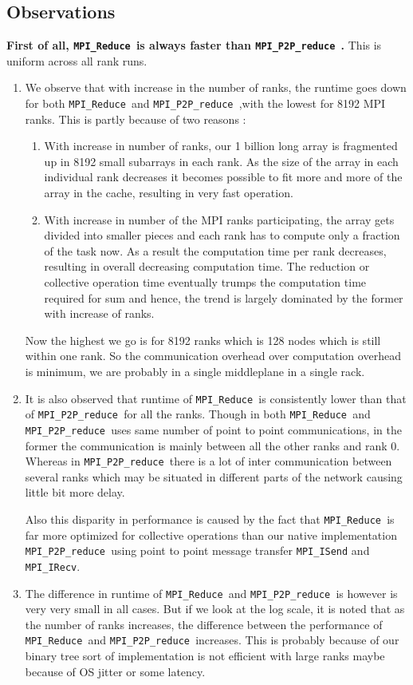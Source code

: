 \documentclass[a4paper,12 pt]{article}
\newcommand{\mpi}{\texttt{MPI\_Reduce }}
\newcommand{\pp}{\texttt{MPI\_P2P\_reduce }}
\begin{document}
\subsection{Observations}
\textbf{First of all, \mpi is always faster than \pp.} This is uniform across all rank runs. 

\begin{enumerate}
\item We observe that with increase in the number of ranks, the runtime goes down for both \mpi and \pp,with the lowest for 8192 MPI ranks. This is partly because of two reasons :
\begin{enumerate}
\item With increase in number of ranks, our 1 billion long array is fragmented up in 8192 small subarrays in each rank. As the size of the array in each individual rank decreases it becomes possible to fit more and more of the array in the cache, resulting in very fast operation.

\item With increase in number of the MPI ranks participating, the array gets divided into smaller pieces and each rank has to compute only a fraction of the task now. As a result the computation time per rank decreases, resulting in overall decreasing computation time. The reduction or collective operation time eventually trumps the computation time required for sum and hence, the trend is largely dominated by the former with increase of ranks.
\end{enumerate}
Now the highest we go is for 8192 ranks which is 128 nodes which is still within one rank. So the communication overhead over computation overhead is minimum, we are probably in a single middleplane in a single rack.

\item It is also observed that runtime of \mpi is consistently lower than that of \pp for all the ranks. Though in both \mpi and \pp uses same number of point to point communications, in the former the communication is mainly between all the other ranks and rank 0. Whereas in \pp there is a lot of inter communication between several ranks which may be situated in different parts of the network causing little bit more delay. 

Also this disparity in performance is caused by the fact that \mpi is far more optimized for collective operations than our native implementation \pp using point to point message transfer \texttt{MPI\_ISend} and \texttt{MPI\_IRecv}. 

\item The difference in runtime of \mpi and \pp is however is very very small in all cases. But if we look at the log scale, it is noted that as the number of ranks increases, the difference between the performance of \mpi and \pp increases. This is probably because of our binary tree sort of implementation is not efficient with large ranks maybe because of OS jitter or some latency. 

\end{enumerate}
\end{document}
